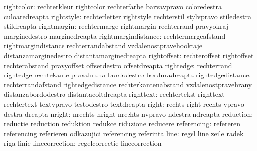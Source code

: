                rightcolor: rechterkleur              rightcolor
                           rechterfarbe              barvavpravo
                           coloredestra              culoaredreapta
               rightstyle: rechterletter             rightstyle
                           rechterstil               stylvpravo
                           stiledestra               stildreapta
              rightmargin: rechtermarge              rightmargin
                           rechterrand               pravyokraj
                           marginedestro             marginedreapta
      rightmargindistance: rechtermargeafstand       rightmargindistance
                           rechterrandabstand        vzdalenostpravehookraje
                           distanzamarginedestro     distantamarginedreapta
              rightoffset: rechteroffset             rightoffset
                           rechterabstand            pravyoffset
                           offsetdestro              offsetdreapta
                rightedge: rechterrand               rightedge
                           rechtekante               pravahrana
                           bordodestro               borduradreapta
        rightedgedistance: rechterrandafstand        rightedgedistance
                           rechterkantenabstand      vzdalenostpravehrany
                           distanzabordodestro       distantacoltdreapta
                righttext: rechtertekst              righttext
                           rechtertext               textvpravo
                           testodestro               textdreapta %
                    right: rechts                    right
                           rechts                    vpravo
                           destra                    dreapta
                   nright: nrechts                   nright
                           nrechts                   nvpravo
                           ndestra                   ndreapta
                reduction: reductie                  reduction
                           reduktion                 redukce
                           riduzione                 reducere
              referencing: refereren                 referencing
                           referieren                odkazujici
                           referencing               referinta %
                     line: regel                     line
                           zeile                     radek
                           riga                      linie
           linecorrection: regelcorrectie            linecorrection
